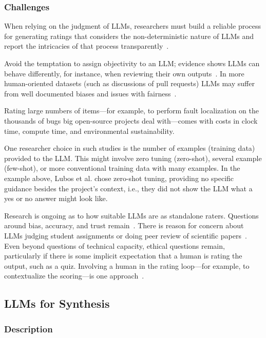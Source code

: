 \documentclass[11pt]{article}
\begin{document}
\subsubsection{Challenges}

When relying on the judgment of LLMs, researchers must build a reliable process for generating ratings that considers the non-deterministic nature of LLMs and report the intricacies of that process transparently~\cite{DBLP:journals/corr/abs-2412-12509}.

Avoid the temptation to assign objectivity to an LLM; evidence shows LLMs can behave differently, for instance, when reviewing their own outputs~\cite{NEURIPS2024_7f1f0218}. In more human-oriented datasets (such as discussions of pull requests) LLMs may suffer from well documented biases and issues with fairness~\cite{Gallegos2024BiasAF}.

Rating large numbers of items---for example, to perform fault localization on the thousands of bugs big open-source projects deal with---comes with costs in clock time, compute time, and environmental sustainability.

One researcher choice in such studies is the number of examples (training data) provided to the LLM. This might involve zero tuning (zero-shot), several example (few-shot), or more conventional training data with many examples. In the example above, Lubos et al. chose zero-shot tuning, providing no specific guidance besides the project's context, i.e., they did not show the LLM what a yes or no answer might look like. 

Research is ongoing as to how suitable LLMs are as standalone raters. Questions around bias, accuracy, and trust remain~\cite{DBLP:journals/corr/abs-2406-18403}. There is reason for concern about LLMs judging student assignments or doing peer review of scientific papers~\cite{DBLP:conf/coling/ZhouC024}. Even beyond questions of technical capacity, ethical questions remain, particularly if there is some implicit expectation that a human is rating the output, such as a quiz. Involving a human in the rating loop---for example, to contextualize the scoring---is one approach~\cite{panHumanCenteredDesignRecommendations2024}.


\subsection{LLMs for Synthesis}

\subsubsection{Description}
\end{document}

